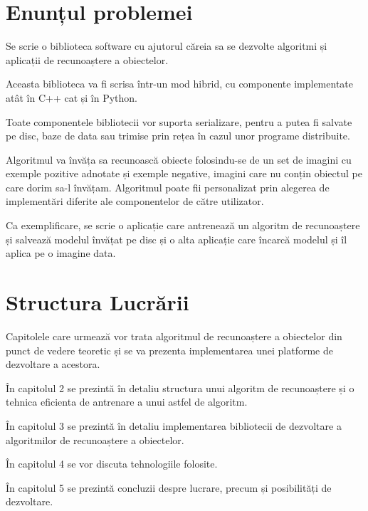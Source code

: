 






\section{Enunțul problemei}
Se scrie o biblioteca software cu ajutorul căreia sa se dezvolte algoritmi și aplicații de recunoaștere a obiectelor.

Aceasta biblioteca va fi scrisa într-un mod hibrid, cu componente implementate atât în C++ cat și în Python.

Toate componentele bibliotecii vor suporta serializare, pentru a putea fi salvate pe disc, baze de data sau trimise prin rețea în cazul unor programe distribuite.

Algoritmul va învăța sa recunoască obiecte folosindu-se de un set de imagini cu exemple pozitive adnotate și exemple negative, imagini care nu conțin obiectul pe care dorim sa-l învățam.
Algoritmul poate fii personalizat prin alegerea de implementări diferite ale componentelor de către utilizator.

Ca exemplificare, se scrie o aplicație care antrenează un algoritm de recunoaștere și salvează modelul învățat pe disc și o alta aplicație care încarcă modelul și îl aplica pe o imagine data.



\section{Structura Lucrării}
Capitolele care urmează vor trata algoritmul de recunoaștere a obiectelor din punct de vedere teoretic și se va prezenta implementarea unei platforme de dezvoltare a acestora.

În capitolul 2 se prezintă în detaliu structura unui algoritm de recunoaștere și o tehnica eficienta de antrenare a unui astfel de algoritm.

În capitolul 3 se prezintă în detaliu implementarea bibliotecii de dezvoltare a algoritmilor de recunoaștere a obiectelor.

În capitolul 4 se vor discuta tehnologiile folosite.

În capitolul 5 se prezintă concluzii despre lucrare, precum și posibilități de dezvoltare.

\pagebreak